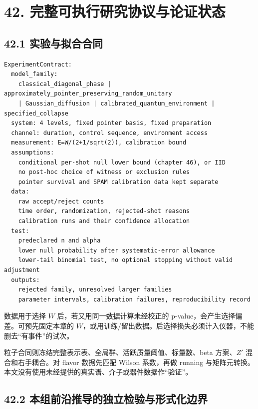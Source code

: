 \documentclass[
  11pt,
  oneside]{book}
\begin{document}
\hypertarget{ch-42}{%
\chapter{42. 完整可执行研究协议与论证状态}\label{ch-42}}

\hypertarget{ux5b9eux9a8cux4e0eux62dfux5408ux5408ux540c}{%
\section{42.1
实验与拟合合同}\label{ux5b9eux9a8cux4e0eux62dfux5408ux5408ux540c}}

\begin{Verbatim}[breaklines,breakanywhere,fontsize=\scriptsize]
ExperimentContract:
  model_family:
    classical_diagonal_phase | approximately_pointer_preserving_random_unitary
    | Gaussian_diffusion | calibrated_quantum_environment | specified_collapse
  system: 4 levels, fixed pointer basis, fixed preparation
  channel: duration, control sequence, environment access
  measurement: E=W/(2+1/sqrt(2)), calibration bound
  assumptions:
    conditional per-shot null lower bound (chapter 46), or IID
    no post-hoc choice of witness or exclusion rules
    pointer survival and SPAM calibration data kept separate
  data:
    raw accept/reject counts
    time order, randomization, rejected-shot reasons
    calibration runs and their confidence allocation
  test:
    predeclared n and alpha
    lower null probability after systematic-error allowance
    lower-tail binomial test, no optional stopping without valid adjustment
  outputs:
    rejected family, unresolved larger families
    parameter intervals, calibration failures, reproducibility record
\end{Verbatim}

数据用于选择 \(W\) 后，若又用同一数据计算未经校正的
p-value，会产生选择偏差。可预先固定本章的
\(W\)，或用训练/留出数据。后选择损失必须计入仪器，不能删去``有事件''的试次。

粒子合同则冻结完整表示表、全局群、活跃质量阈值、标量数、beta
方案、\(Z'\) 混合和右手耦合。对 flavor 数据先匹配 Wilson 系数，再做
running
与矩阵元转换。本文没有使用未经提供的真实谱、介子或器件数据作``验证''。

\hypertarget{ux672cux7ec4ux524dux6cbfux63a8ux5bfcux7684ux72ecux7acbux68c0ux9a8cux4e0eux5f62ux5f0fux5316ux8fb9ux754c}{%
\section{42.2
本组前沿推导的独立检验与形式化边界}\label{ux672cux7ec4ux524dux6cbfux63a8ux5bfcux7684ux72ecux7acbux68c0ux9a8cux4e0eux5f62ux5f0fux5316ux8fb9ux754c}}
\end{document}
